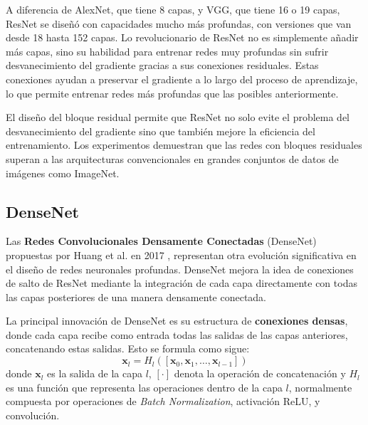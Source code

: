A diferencia de AlexNet, que tiene 8 capas, y VGG, que tiene 16 o 19 capas, ResNet se diseñó con capacidades mucho más profundas, con versiones que van desde 18 hasta 152 capas. Lo revolucionario de ResNet no es simplemente añadir más capas, sino su habilidad para entrenar redes muy profundas sin sufrir desvanecimiento del gradiente gracias a sus conexiones residuales. Estas conexiones ayudan a preservar el gradiente a lo largo del proceso de aprendizaje, lo que permite entrenar redes más profundas que las posibles anteriormente.

El diseño del bloque residual permite que ResNet no solo evite el problema del desvanecimiento del gradiente sino que también mejore la eficiencia del entrenamiento. Los experimentos demuestran que las redes con bloques residuales superan a las arquitecturas convencionales en grandes conjuntos de datos de imágenes como ImageNet.

\subsection{DenseNet}

Las \textbf{Redes Convolucionales Densamente Conectadas} (DenseNet) propuestas por Huang et al. en 2017 \cite{huang2017densely}, representan otra evolución significativa en el diseño de redes neuronales profundas. DenseNet mejora la idea de conexiones de salto de ResNet mediante la integración de cada capa directamente con todas las capas posteriores de una manera densamente conectada.

La principal innovación de DenseNet es su estructura de \textbf{conexiones densas}, donde cada capa recibe como entrada todas las salidas de las capas anteriores, concatenando estas salidas. Esto se formula como sigue:
\begin{equation}
	\mathbf{x}_l = H_{l}([\mathbf{x}_0, \mathbf{x}_1, \dots, \mathbf{x}_{l-1}])
\end{equation}
donde \(\mathbf{x}_l\) es la salida de la capa \(l\), \([ \cdot ]\) denota la operación de concatenación y \(H_l\) es una función que representa las operaciones dentro de la capa \(l\), normalmente compuesta por operaciones de \textit{Batch Normalization}, activación ReLU, y convolución.

